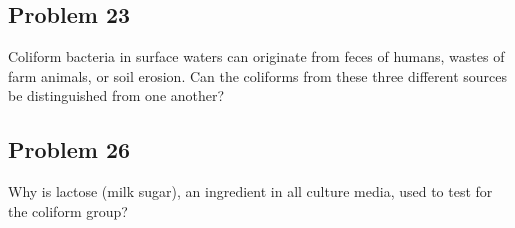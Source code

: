 \subsection*{Problem 23}
Coliform bacteria in surface waters can originate from feces of humans, wastes of farm animals, or soil erosion. Can the coliforms from these three different sources be distinguished from one another?
\subsection*{Problem 26}
Why is lactose (milk sugar), an ingredient in all culture media, used to test for the coliform group?